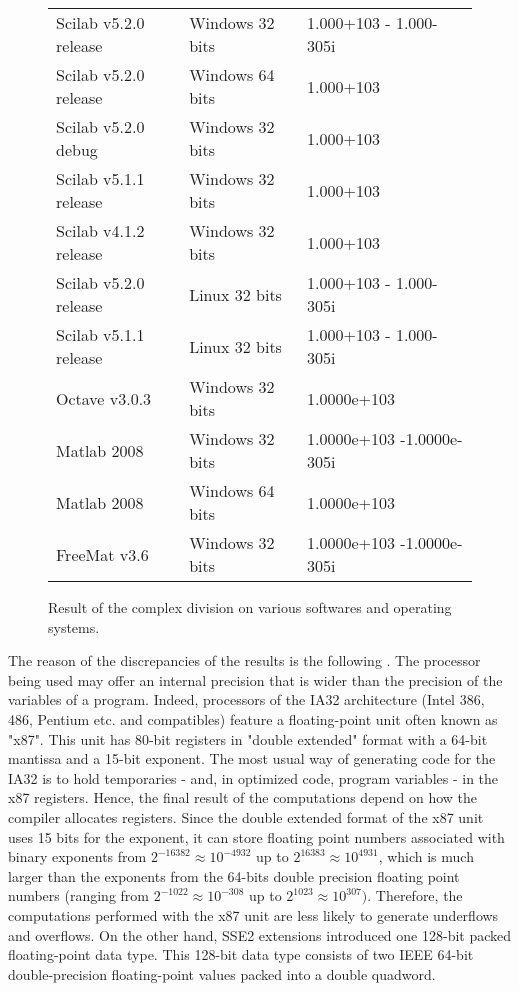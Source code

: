 \begin{figure}
\begin{center}
\begin{tabular}{|l|l|l|}
\hline
Scilab v5.2.0 release & Windows 32 bits & 1.000+103 - 1.000-305i \\
Scilab v5.2.0 release & Windows 64 bits & 1.000+103 \\
Scilab v5.2.0 debug   & Windows 32 bits & 1.000+103 \\
Scilab v5.1.1 release & Windows 32 bits & 1.000+103 \\
Scilab v4.1.2 release & Windows 32 bits & 1.000+103 \\
Scilab v5.2.0 release & Linux 32 bits   & 1.000+103 - 1.000-305i \\
Scilab v5.1.1 release & Linux 32 bits   & 1.000+103 - 1.000-305i \\
Octave v3.0.3         & Windows 32 bits & 1.0000e+103 \\
Matlab 2008           & Windows 32 bits & 1.0000e+103 -1.0000e-305i \\
Matlab 2008           & Windows 64 bits & 1.0000e+103 \\
FreeMat v3.6          & Windows 32 bits & 1.0000e+103 -1.0000e-305i \\
\hline
\end{tabular}
\end{center}
\caption{Result of the complex division  on various 
softwares and operating systems.}
\label{fig-compdiv-weird}
\end{figure}

The reason of the discrepancies of the results is the following \cite{MullerEtAl2010,Monniaux2008}. 
The processor being used may offer an internal precision that is wider than the 
precision of the variables of a program. 
Indeed, processors of the IA32 architecture (Intel 386, 486, Pentium etc. and 
compatibles) feature a floating-point unit often known as "x87".
This unit has 80-bit registers in "double extended" format with a 64-bit mantissa and
a 15-bit exponent. The most usual way of generating code for the IA32 is to hold temporaries -
and, in optimized code, program variables - in the x87 registers.
Hence, the final result of the computations depend on how the compiler allocates registers.
Since the double extended format of the x87 unit uses 15 bits for the exponent, 
it can store floating point numbers associated with binary exponents from 
$2^{-16382}\approx 10^{-4932}$ up to $2^{16383}\approx 10^{4931}$,
which is much larger than the exponents from the 64-bits double precision 
floating point numbers (ranging from $2^{-1022}\approx 10^{-308}$ up to $2^{1023}\approx 10^{307})$.
Therefore, the computations performed with the x87 unit are less likely to 
generate underflows and overflows. On the other hand, SSE2 extensions introduced 
one 128-bit packed floating-point data type. This 128-bit data type consists of
two IEEE 64-bit double-precision floating-point values packed into a double
quadword.

